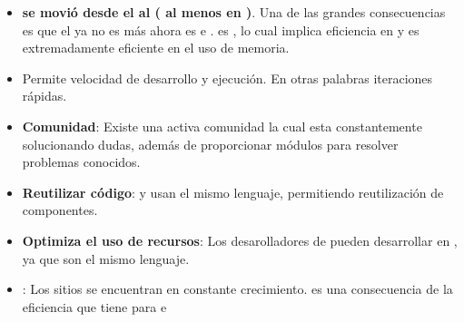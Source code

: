 \begin{itemize}
	\item \textbf{\frontEndAS se movió desde el \serverSideAS al \clientSideAS ( al menos en \mobileINT )}. Una de las grandes consecuencias es que el \serverSideAS ya no es más \cpuBoundPC ahora es \memoryBoundPC e \ioBoundPC. \nodejsNAME es \eventdrivenPL, lo cual implica eficiencia en \ioBoundPC y es extremadamente eficiente en el uso de memoria.
	\item Permite velocidad de desarrollo y ejecución. En otras palabras iteraciones rápidas.
	\item \textbf{Comunidad}: Existe una activa comunidad la cual esta constantemente solucionando dudas, además de proporcionar módulos para resolver problemas conocidos.
	\item \textbf{Reutilizar código}: \serverSideAS y \clientSideAS usan el mismo lenguaje, permitiendo reutilización de componentes.
	\item \textbf{Optimiza el uso de recursos}: Los desarolladores de \clientSideAS pueden desarrollar en \serverSideAS, ya que son el mismo lenguaje.
	\item \textbf{\scalabilityQA}: Los sitios \webINT se encuentran en constante crecimiento. \scalabilityQA es una consecuencia de la eficiencia que tiene \nodejsNAME para \memoryBoundPC e \ioBoundPC
\end{itemize}

